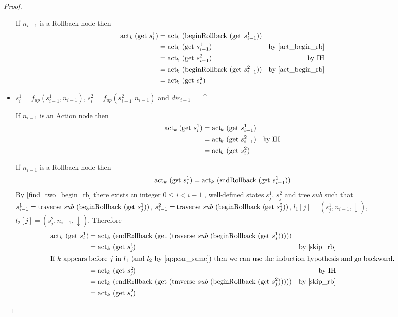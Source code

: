 \documentclass{article}
\newcommand{\textfun}[1]{\textup{#1}}
\newcommand{\fup}[2]{\ensuremath{f_{up}(#1, #2)}}
\newcommand{\traverse}[2]{\textfun{traverse}\ #1\ #2}
\newcommand{\up}{\uparrow}
\newcommand{\down}{\downarrow}
\newcommand{\beginRb}[1]{\textfun{beginRollback}\ #1}
\newcommand{\enRb}[1]{\textfun{endRollback}\ #1}
\newcommand{\get}[1]{\textfun{get}\ #1}
\newcommand{\actkey}[2]{\textfun{act}_{#1}\ #2}
\begin{document}
\begin{proof}
\begin{itemize}
        If $n_{i - 1}$ is a Rollback node then
        \begin{align*}
            \actkey{k}{(\get{s^1_i})} &= \actkey{k}{(\beginRb{(\get{s^1_{i - 1}})})}\\
            &= \actkey{k}{(\get{s^1_{i - 1}})} &\text{by \cref{act_begin_rb}} \\
            &= \actkey{k}{(\get{s^2_{i - 1}})} &\text{by IH} \\
            &= \actkey{k}{(\beginRb{(\get{s^2_{i - 1}})})} &\text{by \cref{act_begin_rb}}\\
            &= \actkey{k}{(\get{s^2_i})}
        \end{align*}

        \item $s^1_i = \fup{s^1_{i - 1}}{n_{i - 1}}$, $s^2_i = \fup{s^2_{i - 1}}{n_{i - 1}}$ and $dir_{i - 1} =\, \up$
        
        If $n_{i - 1}$ is an Action node then
        \begin{align*}
            \actkey{k}{(\get{s^1_i})} &= \actkey{k}{(\get{s^1_{i - 1}})} \\
            &= \actkey{k}{(\get{s^2_{i - 1}})} &\text{by IH}\\
            &=\actkey{k}{(\get{s^2_i})}
        \end{align*}

        If $n_{i - 1}$ is a Rollback node then
        \[\actkey{k}{(\get{s^1_i})} = \actkey{k}{(\enRb{(\get{s^1_{i - 1}})})} \]
        By \cref{find_two_begin_rb} there exists an integer $0 \leq j < i - 1$ , well-defined states $s^1_{j}$, $s^2_{j}$ and tree $sub$ such that $s^1_{i - 1} = \traverse{sub}{(\beginRb{(\get{s^1_{j}})})}$, 
        $s^2_{i - 1} = \traverse{sub}{(\beginRb{(\get{s^2_{j}})})}$, $l_1[j] = (s^1_j, n_{i - 1}, \down)$, $l_2[j] = (s^2_j, n_{i - 1}, \down)$. Therefore
        \begin{align*}
            \actkey{k}{(\get{s^1_i})} &= \actkey{k}{(\enRb{(\get{(\traverse{sub}{(\beginRb{(\get{s^1_{j}})})})})})} \\
            &= \actkey{k}{(\get{s^1_{j}})} &\text{by \cref{skip_rb}} \\
        \intertext{If $k$ appears before $j$ in $l_1$ (and $l_2$ by \cref{appear_same}) then we can use the induction hypothesis and go backward.}
            &= \actkey{k}{(\get{s^2_{j}})} &\text{by IH} \\
            &= \actkey{k}{(\enRb{(\get{(\traverse{sub}{(\beginRb{(\get{s^2_{j}})})})})})} &\text{by \cref{skip_rb}}\\
            &= \actkey{k}{(\get{s^2_i})}
        \end{align*}


\end{itemize}
\end{proof}
\end{document}
